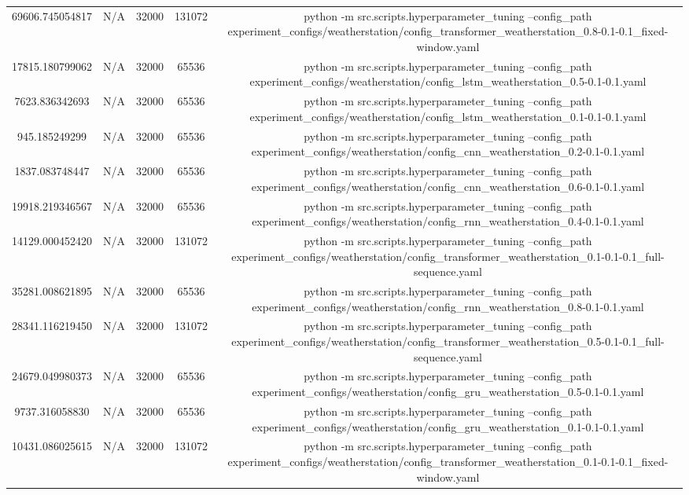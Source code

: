 \begin{table}[h]
\begin{tabular}{c | c | c | c | c}
69606.745054817 & N/A & 32000 & 131072 & python -m src.scripts.hyperparameter_tuning --config_path experiment_configs/weatherstation/config_transformer_weatherstation_0.8-0.1-0.1_fixed-window.yaml \\
17815.180799062 & N/A & 32000 & 65536 & python -m src.scripts.hyperparameter_tuning --config_path experiment_configs/weatherstation/config_lstm_weatherstation_0.5-0.1-0.1.yaml \\
7623.836342693 & N/A & 32000 & 65536 & python -m src.scripts.hyperparameter_tuning --config_path experiment_configs/weatherstation/config_lstm_weatherstation_0.1-0.1-0.1.yaml \\
945.185249299 & N/A & 32000 & 65536 & python -m src.scripts.hyperparameter_tuning --config_path experiment_configs/weatherstation/config_cnn_weatherstation_0.2-0.1-0.1.yaml \\
1837.083748447 & N/A & 32000 & 65536 & python -m src.scripts.hyperparameter_tuning --config_path experiment_configs/weatherstation/config_cnn_weatherstation_0.6-0.1-0.1.yaml \\
19918.219346567 & N/A & 32000 & 65536 & python -m src.scripts.hyperparameter_tuning --config_path experiment_configs/weatherstation/config_rnn_weatherstation_0.4-0.1-0.1.yaml \\
14129.000452420 & N/A & 32000 & 131072 & python -m src.scripts.hyperparameter_tuning --config_path experiment_configs/weatherstation/config_transformer_weatherstation_0.1-0.1-0.1_full-sequence.yaml \\
35281.008621895 & N/A & 32000 & 65536 & python -m src.scripts.hyperparameter_tuning --config_path experiment_configs/weatherstation/config_rnn_weatherstation_0.8-0.1-0.1.yaml \\
28341.116219450 & N/A & 32000 & 131072 & python -m src.scripts.hyperparameter_tuning --config_path experiment_configs/weatherstation/config_transformer_weatherstation_0.5-0.1-0.1_full-sequence.yaml \\
24679.049980373 & N/A & 32000 & 65536 & python -m src.scripts.hyperparameter_tuning --config_path experiment_configs/weatherstation/config_gru_weatherstation_0.5-0.1-0.1.yaml \\
9737.316058830 & N/A & 32000 & 65536 & python -m src.scripts.hyperparameter_tuning --config_path experiment_configs/weatherstation/config_gru_weatherstation_0.1-0.1-0.1.yaml \\
10431.086025615 & N/A & 32000 & 131072 & python -m src.scripts.hyperparameter_tuning --config_path experiment_configs/weatherstation/config_transformer_weatherstation_0.1-0.1-0.1_fixed-window.yaml \\

\end{tabular}
\end{table}
